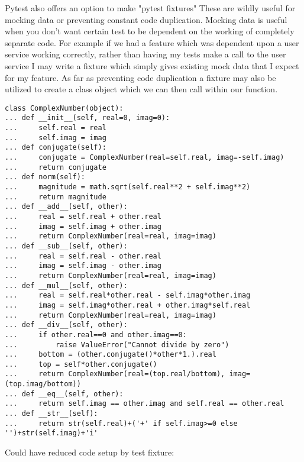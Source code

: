 \documentclass[nociteref]{../../SIAM-GH-book}
\begin{document}
Pytest also offers an option to make "pytest fixtures" These are wildly useful for mocking data or preventing constant code duplication.
Mocking data is useful when you don't want certain test to be dependent on the working of completely separate code.
For example if we had a feature which was dependent upon a user service working correctly, rather than having my tests make a call to the user service I may write a fixture which simply gives existing mock data that I expect for my feature.
As far as preventing code duplication a fixture may also be utilized to create a class object which we can then call within our function.

\begin{lstlisting}
class ComplexNumber(object):
... def __init__(self, real=0, imag=0):
...     self.real = real
...     self.imag = imag
... def conjugate(self):
...     conjugate = ComplexNumber(real=self.real, imag=-self.imag)
...     return conjugate
... def norm(self):
...     magnitude = math.sqrt(self.real**2 + self.imag**2)
...     return magnitude
... def __add__(self, other):
...     real = self.real + other.real
...     imag = self.imag + other.imag
...     return ComplexNumber(real=real, imag=imag)
... def __sub__(self, other):
...     real = self.real - other.real
...     imag = self.imag - other.imag
...     return ComplexNumber(real=real, imag=imag)
... def __mul__(self, other):
...     real = self.real*other.real - self.imag*other.imag
...     imag = self.imag*other.real + other.imag*self.real
...     return ComplexNumber(real=real, imag=imag)
... def __div__(self, other):
...     if other.real==0 and other.imag==0:
...         raise ValueError("Cannot divide by zero")
...     bottom = (other.conjugate()*other*1.).real
...     top = self*other.conjugate()
...     return ComplexNumber(real=(top.real/bottom), imag=(top.imag/bottom))
... def __eq__(self, other):
...     return self.imag == other.imag and self.real == other.real
... def __str__(self):
...     return str(self.real)+('+' if self.imag>=0 else '')+str(self.imag)+'i'
\end{lstlisting}
Could have reduced code setup by test fixture:
\end{document}
